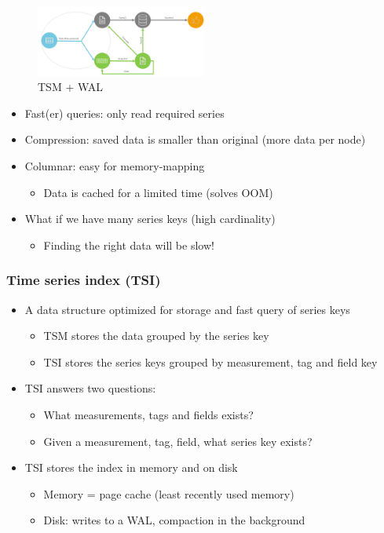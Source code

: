 \documentclass{article}
\begin{document}
\begin{figure}[H]
    \centering
    \includegraphics[width=0.5\textwidth]{tick-architecture-wal-tsm.png}
    \caption{TSM + WAL}
\end{figure}

\begin{itemize}
    \item Fast(er) queries: only read required series
    \item Compression: saved data is smaller than original (more data per node)
    \item Columnar: easy for memory-mapping
    \begin{itemize}
        \item Data is cached for a limited time (solves OOM)
    \end{itemize}
    \item What if we have many series keys (high cardinality)
    \begin{itemize}
        \item Finding the right data will be slow!
    \end{itemize}
\end{itemize}

\subsubsection{Time series index (TSI)}

\begin{itemize}
    \item A data structure optimized for storage and fast query of series keys
    \begin{itemize}
        \item TSM stores the data grouped by the series key
        \item TSI stores the series keys grouped by measurement, tag and field key
    \end{itemize}
    \item TSI answers two questions:
    \begin{itemize}
        \item What measurements, tags and fields exists?
        \item Given a measurement, tag, field, what series key exists?
    \end{itemize}
    \item TSI stores the index in memory and on disk
    \begin{itemize}
        \item Memory = page cache (least recently used memory)
        \item Disk: writes to a WAL, compaction in the background
    \end{itemize}
\end{itemize}
\end{document}

